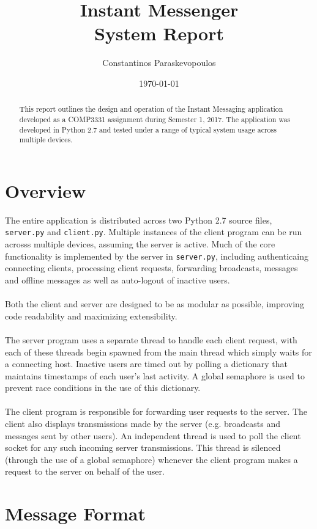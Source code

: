 \documentclass[12pt,a4paper]{article}
\title{Instant Messenger \\ \large System Report}
\author{Constantinos Paraskevopoulos}
\date{\today}
\begin{document}
\maketitle

\begin{abstract}
This report outlines the design and operation of the Instant Messaging application developed as a COMP3331 assignment during Semester 1, 2017. The application was developed in Python 2.7 and tested under a range of typical system usage across multiple devices.
\end{abstract}

\section{Overview}
\label{sec:overview}

The entire application is distributed across two Python 2.7 source files, \verb|server.py| and \verb|client.py|. Multiple instances of the client program can be run acrosss multiple devices, assuming the server is active. Much of the core functionality is implemented by the server in \verb|server.py|, including authenticaing connecting clients, processing client requests, forwarding broadcasts, messages and offline messages as well as auto-logout of inactive users.
\\\\
Both the client and server are designed to be as modular as possible, improving code readability and maximizing extensibility.
\\\\
The server program uses a separate thread to handle each client request, with each of these threads begin spawned from the main thread which simply waits for a connecting host. Inactive users are timed out by polling a dictionary that maintains timestamps of each user's last activity. A global semaphore is used to prevent race conditions in the use of this dictionary.
\\\\
The client program is responsible for forwarding user requests to the server. The client also displays transmissions made by the server (e.g. broadcasts and messages sent by other users). An independent thread is used to poll the client socket for any such incoming server transmissions. This thread is silenced (through the use of a global semaphore) whenever the client program makes a request to the server on behalf of the user.

\section{Message Format}
\label{sec:msg_format}
\end{document}
